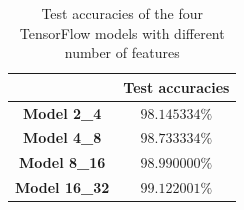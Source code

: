 \begin{table}
	\caption{Test accuracies of the four TensorFlow models with different number of features}
	\label{tab:test_accuracies}
	\centering
	\begin{tabular}{cc}
		\hline
		& \textbf{Test accuracies} \\
		\hline
		\textbf{Model 2\_4} & $98.145334 \%$ \\
		\textbf{Model 4\_8} & $98.733334 \%$ \\
		\textbf{Model 8\_16} & $98.990000 \%$ \\
		\textbf{Model 16\_32} & $99.122001 \%$ \\
		\hline
	\end{tabular}
\end{table}